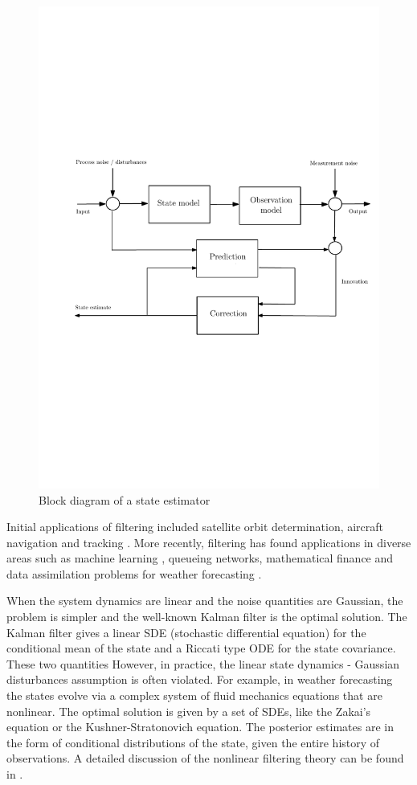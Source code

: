 \begin{figure}
	\centering
	\includegraphics[width=7in]{images/Chap1_state_est_block}
	\caption{Block diagram of a state estimator}
	\label{Fig:state_estimator}
\end{figure}
Initial applications of filtering included satellite orbit determination, aircraft navigation and tracking \cite{kutsurpfi19}. More recently, filtering has found applications in diverse areas such as machine learning \cite{bishop06}, queueing networks, mathematical finance \cite{brihan08} and data assimilation problems for weather forecasting \cite{eve94}. 

When the system dynamics are linear and the noise quantities are Gaussian, the problem is simpler and the well-known Kalman filter is the optimal solution. The Kalman filter gives a linear SDE (stochastic differential equation) for the conditional mean of the state and a Riccati type ODE for the state covariance. These two quantities However, in practice, the linear state dynamics - Gaussian disturbances assumption is often violated.  For example, in weather forecasting the states evolve via a complex system of fluid mechanics equations that are nonlinear. The optimal solution is given by a set of SDEs, like the Zakai's equation or the Kushner-Stratonovich equation. The posterior estimates are in the form of conditional distributions of the state, given the entire history of observations. A detailed discussion of the nonlinear filtering theory can be found in \cite{baicri08}. 


